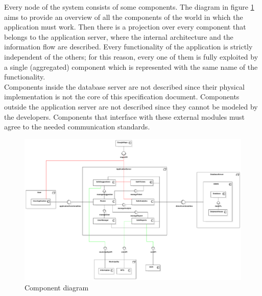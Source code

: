 \documentclass[./main.tex]{subfiles}
\begin{document}
Every node of the system consists of some components. The diagram in figure
\ref{fig:component_diagram} aims to provide an overview of all the components
of the world in which the application must work. Then there is a projection
over every component that belongs to the application server, where the internal
architecture and the information flow are described. Every functionality of the
application is strictly independent of the others; for this reason, every one
of them is fully exploited by a single (aggregated) component which is
represented with the same name of the functionality.\medskip\\
Components inside the database server are not described since their physical
implementation is not the core of this specification document. Components
outside the application server are not described since they cannot be modeled
by the developers. Components that interface with these external modules must
agree to the needed communication standards.

\begin{figure}[H]
\centering
\includegraphics[width=\textwidth]{resources/component_diagram/component_diagram}
\caption{Component diagram}
\label{fig:component_diagram}
\end{figure}
\end{document}
